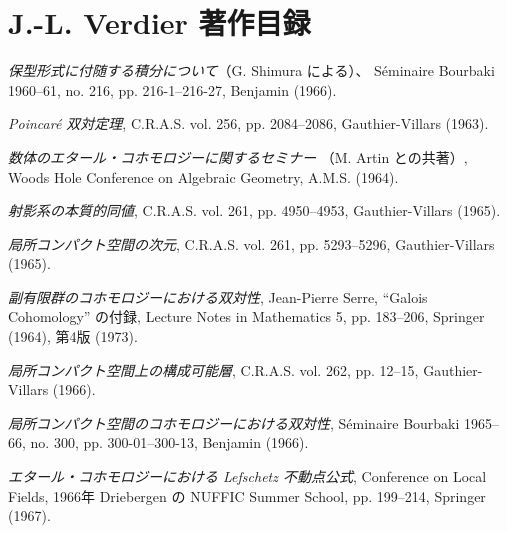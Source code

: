 \clearpage
{}
\chapter*{J.-L. Verdier 著作目録}

\small
\begin{description}
\item[{[01]}] \emph{保型形式に付随する積分について}（G. Shimura による）、
Séminaire Bourbaki 1960--61, no. 216, pp. 216-1--216-27,
Benjamin (1966).

\item[{[02]}] \emph{Poincaré 双対定理}, C.R.A.S. vol. 256,
pp. 2084--2086, Gauthier-Villars (1963).

\item[{[03]}] \emph{数体のエタール・コホモロジーに関するセミナー}
（M. Artin との共著）, Woods Hole Conference on Algebraic Geometry,
A.M.S. (1964).

\item[{[04]}] \emph{射影系の本質的同値}, C.R.A.S. vol. 261,
pp. 4950--4953, Gauthier-Villars (1965).

\item[{[05]}] \emph{局所コンパクト空間の次元}, C.R.A.S. vol. 261,
pp. 5293--5296, Gauthier-Villars (1965).

\item[{[06]}] \emph{副有限群のコホモロジーにおける双対性}, Jean-Pierre
Serre, ``Galois Cohomology'' の付録, Lecture Notes in Mathematics 5,
pp. 183--206, Springer (1964), 第4版 (1973).

\item[{[07]}] \emph{局所コンパクト空間上の構成可能層}, C.R.A.S. vol. 262,
pp. 12--15, Gauthier-Villars (1966).

\item[{[08]}] \emph{局所コンパクト空間のコホモロジーにおける双対性},
Séminaire Bourbaki 1965--66, no. 300, pp. 300-01--300-13,
Benjamin (1966).

\item[{[09]}] \emph{エタール・コホモロジーにおける Lefschetz 不動点公式},
Conference on Local Fields, 1966年 Driebergen の NUFFIC Summer School,
pp. 199--214, Springer (1967).


\end{description}
